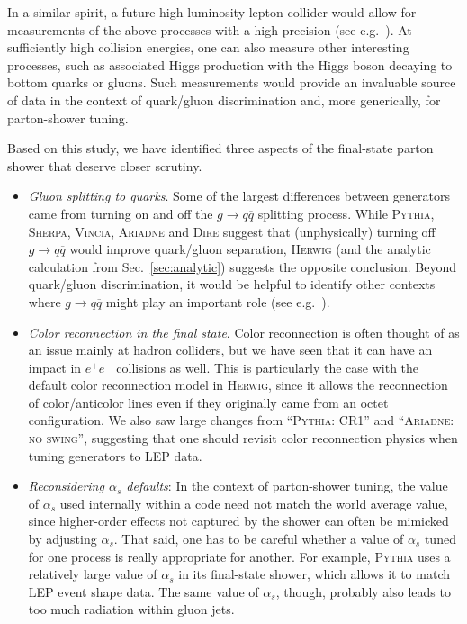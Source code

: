 \documentclass[11pt,letterpaper]{article}
\DeclareRobustCommand{\Sec}[1]{Sec.~\ref{#1}}
\begin{document}
In a similar spirit, a future high-luminosity lepton collider would allow for measurements of the above processes with a high precision (see
e.g.~\cite{Anderle:2017qwx}).  At sufficiently high collision energies, one can also measure other interesting processes, such as associated Higgs production with the Higgs boson decaying to bottom quarks or gluons.  Such measurements would provide an invaluable source of data in the context of quark/gluon discrimination and, more generically, for parton-shower tuning.

Based on this study, we have identified three aspects of the final-state parton shower that deserve closer scrutiny.
\begin{itemize}
\item \textit{Gluon splitting to quarks}.  Some of the largest differences between generators came from turning on and off the $g \to q \overline{q}$ splitting process.  While \textsc{Pythia}, \textsc{Sherpa}, \textsc{Vincia}, \textsc{Ariadne} and \textsc{Dire} suggest that (unphysically) turning off $g \to q \overline{q}$ would improve quark/gluon separation, \textsc{Herwig} (and the analytic calculation from \Sec{sec:analytic}) suggests the opposite conclusion.  Beyond quark/gluon discrimination, it would be helpful to identify other contexts where $g \to q \overline{q}$ might play an important role (see e.g.~\cite{Ilten:2017rbd}).
\item \textit{Color reconnection in the final state}.  Color reconnection is often thought of as an issue mainly at hadron colliders, but we have seen that it can have an impact in $e^+ e^-$ collisions as well.  This is particularly the case with the default color reconnection model in \textsc{Herwig}, since it allows the reconnection of color/anticolor lines even if they originally came from an octet configuration.  We also saw large changes from ``\textsc{Pythia: CR1}'' and  ``\textsc{Ariadne: no swing}'', suggesting that one should revisit color reconnection physics when tuning generators to LEP data.
\item \textit{Reconsidering $\alpha_s$ defaults}:  In the context of parton-shower tuning, the value of $\alpha_s$ used internally within a code need not match the world average value, since higher-order effects not captured by the shower can often be mimicked by adjusting $\alpha_s$.  That said, one has to be careful whether a value of $\alpha_s$ tuned for one process is really appropriate for another.  For example, \textsc{Pythia} uses a relatively large value of $\alpha_s$ in its final-state shower, which allows it to match LEP event shape data.  The same value of $\alpha_s$, though, probably also leads to too much radiation within gluon jets.
\end{itemize}
\end{document}
